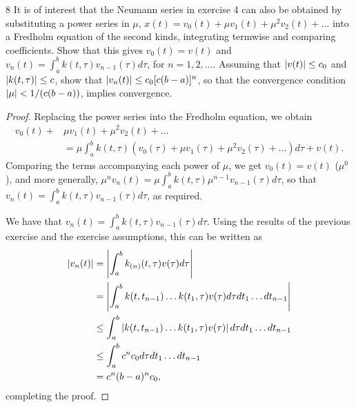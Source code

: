 \begin{exercise}{8}
It is of interest that the Neumann series in exercise 4 can also be obtained by substituting a power series in $\mu$, $x(t) = v_0(t) + \mu v_1(t) + \mu^2 v_2(t) + \dots$ into a Fredholm equation of the second kinds, integrating termwise and comparing coefficients.
Show that this gives $v_0(t) = v(t)$ and $v_n(t) = \int_a^b k(t, \tau) v_{n-1}(\tau) d\tau$, for $n = 1, 2, \dots$.
Assuming that $\left\lvert v(t)\right\rvert \leq c_0$ and $\left\lvert k(t, \tau)\right\rvert \leq c$, show that $\left\lvert v_n(t)\right\rvert \leq c_0[c(b - a)]^n$, so that the convergence condition $\left\lvert \mu\right\rvert < 1/(c(b-a))$, implies convergence.
\end{exercise}
\begin{proof}
Replacing the power series into the Fredholm equation, we obtain
\begin{align*}
    v_0(t) +& \mu v_1(t) + \mu^2 v_2(t) + \dots\\
    &= \mu \int_a^b k(t, \tau)(v_0(\tau) + \mu v_1(\tau) + \mu^2 v_2(\tau) + \dots) d\tau +  v(t).
\end{align*}
Comparing the terms accompanying each power of $\mu$, we get $v_0(t) = v(t)$ ($\mu^0$), and more generally, $\mu^n v_n(t) = \mu \int_a^b k(t, \tau) \mu^{n-1}v_{n-1}(\tau) d\tau$, so that $v_n(t) = \int_a^b k(t, \tau) v_{n-1}(\tau) d\tau$, as required.

We have that $v_n(t) = \int_a^b k(t, \tau) v_{n-1}(\tau) d\tau$.
Using the results of the previous exercise and the exercise assumptions, this can be written as 
\begin{align*}
    \left\lvert v_n(t)\right\rvert
    &= \left\lvert \int_a^b k_{(n)}(t, \tau) v(\tau) d\tau\right\rvert\\
    &= \left\lvert \int_a^b k(t, t_{n-1}) \dots k(t_1, \tau) v(\tau) d\tau dt_1 \dots dt_{n-1}\right\rvert\\
    &\leq \int_a^b \left\lvert k(t, t_{n-1}) \dots k(t_1, \tau) v(\tau)\right\rvert d\tau dt_1 \dots dt_{n-1}\\
    &\leq \int_a^b c^n c_0 d\tau dt_1 \dots dt_{n-1}\\
    &= c^n(b-a)^n c_0,
\end{align*}
completing the proof.
\end{proof} 
